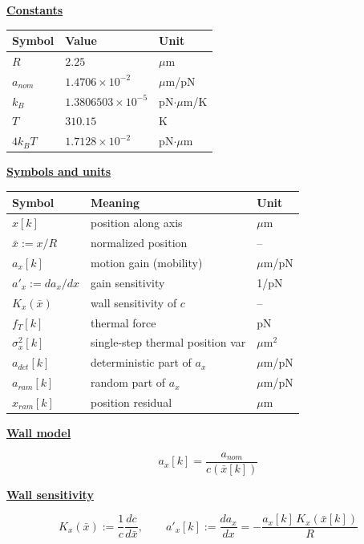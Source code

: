 \documentclass[11pt,a4paper,fontset=none]{ctexart}
\newcommand{\hd}[1]{\par\medskip\noindent\underline{\textbf{#1}}\par\nobreak\vspace{0.2ex}}
\begin{document}
\hd{Constants}
\begin{center}
\begin{tabular}{lll}
\toprule
Symbol & Value & Unit \\
\midrule
$R$        & $2.25$                     & $\mu$m \\
$a_{nom}$  & $1.4706\times10^{-2}$      & $\mu$m/pN \\
$k_B$      & $1.3806503\times10^{-5}$   & pN$\cdot\mu$m/K \\
$T$        & $310.15$                   & K \\
$4k_BT$    & $1.7128\times10^{-2}$      & pN$\cdot\mu$m \\
\bottomrule
\end{tabular}
\end{center}

\medskip
\hd{Symbols and units}
\begin{center}
\begin{tabular}{lll}
\toprule
Symbol & Meaning & Unit \\
\midrule
$x[k]$              & position along axis            & $\mu$m \\
$\bar x := x/R$     & normalized position             & -- \\
$a_x[k]$            & motion gain (mobility)          & $\mu$m/pN \\
$a'_x := da_x/dx$   & gain sensitivity                & 1/pN \\
$K_x(\bar x)$       & wall sensitivity of $c$          & -- \\
$f_T[k]$            & thermal force                   & pN \\
$\sigma^2_x[k]$     & single-step thermal position var & $\mu$m$^2$ \\
$a_{det}[k]$        & deterministic part of $a_x$      & $\mu$m/pN \\
$a_{ram}[k]$        & random part of $a_x$             & $\mu$m/pN \\
$x_{ram}[k]$        & position residual                & $\mu$m \\
\bottomrule
\end{tabular}
\end{center}

\medskip
\hd{Wall model}
\[ a_x[k] = \frac{a_{nom}}{c(\bar x[k])} \]

\medskip
\hd{Wall sensitivity}
\[
K_x(\bar x) := \frac{1}{c}\frac{dc}{d\bar x},
\qquad
a'_x[k] := \frac{d a_x}{d x} = -\frac{a_x[k]\,K_x(\bar x[k])}{R}
\]
\end{document}
